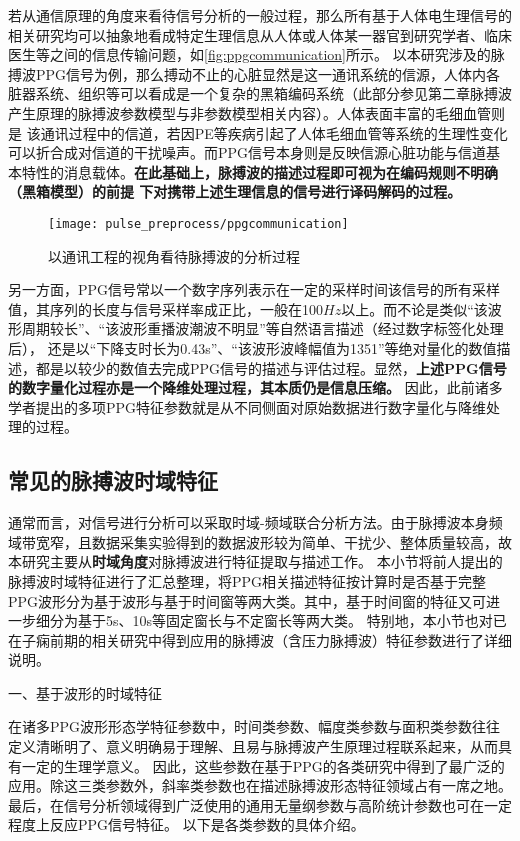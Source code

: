 若从通信原理的角度来看待信号分析的一般过程，那么所有基于人体电生理信号的相关研究均可以抽象地看成特定生理信息从人体或人体某一器官到研究学者、临床医生等之间的信息传输问题，如\autoref{fig:ppgcommunication}所示。
以本研究涉及的脉搏波PPG信号为例，那么搏动不止的心脏显然是这一通讯系统的信源，人体内各脏器系统、组织等可以看成是一个复杂的黑箱编码系统（此部分参见第二章脉搏波产生原理的脉搏波参数模型与非参数模型相关内容）。人体表面丰富的毛细血管则是
该通讯过程中的信道，若因PE等疾病引起了人体毛细血管等系统的生理性变化可以折合成对信道的干扰噪声。而PPG信号本身则是反映信源心脏功能与信道基本特性的消息载体。\textbf{在此基础上，脉搏波的描述过程即可视为在编码规则不明确（黑箱模型）的前提
下对携带上述生理信息的信号进行译码解码的过程。}
\begin{figure}[htbp]
    \centering
    \texttt{[image: pulse\_preprocess/ppgcommunication]}
    \caption{\label{fig:ppgcommunication}以通讯工程的视角看待脉搏波的分析过程}
\end{figure}

另一方面，PPG信号常以一个数字序列表示在一定的采样时间该信号的所有采样值，其序列的长度与信号采样率成正比，一般在100$Hz$以上。而不论是类似“该波形周期较长”、“该波形重播波潮波不明显”等自然语言描述（经过数字标签化处理后），
还是以“下降支时长为0.43s”、“该波形波峰幅值为1351”等绝对量化的数值描述，都是以较少的数值去完成PPG信号的描述与评估过程。显然，\textbf{上述PPG信号的数字量化过程亦是一个降维处理过程，其本质仍是信息压缩。}
因此，此前诸多学者提出的多项PPG特征参数就是从不同侧面对原始数据进行数字量化与降维处理的过程。

\subsection{常见的脉搏波时域特征}
通常而言，对信号进行分析可以采取时域-频域联合分析方法。由于脉搏波本身频域带宽窄，且数据采集实验得到的数据波形较为简单、干扰少、整体质量较高，故本研究主要从\textbf{时域角度}对脉搏波进行特征提取与描述工作。
本小节将前人提出的脉搏波时域特征进行了汇总整理，将PPG相关描述特征按计算时是否基于完整PPG波形分为基于波形与基于时间窗等两大类。其中，基于时间窗的特征又可进一步细分为基于5s、10s等固定窗长与不定窗长等两大类。
特别地，本小节也对已在子痫前期的相关研究中得到应用的脉搏波（含压力脉搏波）特征参数进行了详细说明。

一、基于波形的时域特征

在诸多PPG波形形态学特征参数中，时间类参数、幅度类参数与面积类参数往往定义清晰明了、意义明确易于理解、且易与脉搏波产生原理过程联系起来，从而具有一定的生理学意义。
因此，这些参数在基于PPG的各类研究中得到了最广泛的应用\cite{cwl,mmt}。除这三类参数外，斜率类参数也在描述脉搏波形态特征领域占有一席之地。
最后，在信号分析领域得到广泛使用的通用无量纲参数与高阶统计参数也可在一定程度上反应PPG信号特征。
以下是各类参数的具体介绍。

